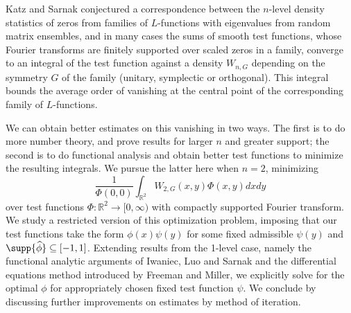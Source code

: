 Katz and Sarnak conjectured a
correspondence between the $n$-level density statistics of zeros from
families of $L$-functions
with eigenvalues from random matrix ensembles, and in many cases the sums of smooth test functions, whose Fourier transforms are
finitely supported over scaled zeros in a family, converge to an integral of
the test function against a density $W_{n, G}$ depending on the
symmetry $G$ of the family (unitary, symplectic or orthogonal). This integral bounds the average order of vanishing at the central point of the corresponding family of $L$-functions. 

We can obtain better estimates on this vanishing in two ways. The first is
to do more number theory, and prove results for larger $n$ and greater
support; the second is to do functional analysis and obtain better test
functions to minimize the resulting integrals. We pursue the latter here
when $n=2$, minimizing  
	\[ \frac{1}{\Phi(0, 0)} \int_{{\mathbb R}^2} W_{2,G} (x, y) \Phi(x, y) dx dy \] 
over test functions $\Phi : {\mathbb R}^2
\to [0, \infty)$ with compactly supported Fourier transform. We study a
restricted version of this optimization problem, imposing that our test
functions take the form $\phi(x) \psi(y)$ for some fixed admissible $\psi(y)$ and
$\supp{\widehat \phi} \subseteq [-1, 1]$. Extending results from the 1-level case, namely the functional analytic arguments of Iwaniec, Luo and Sarnak and the differential equations method introduced by Freeman and Miller, we explicitly solve for the optimal $\phi$ for appropriately chosen fixed test function $\psi$. We conclude by discussing further improvements on estimates  by method of iteration.